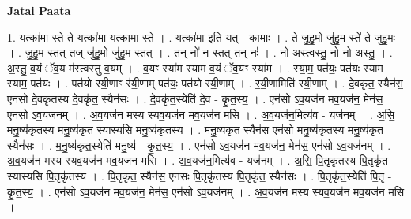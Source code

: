 \documentclass[17pt]{extarticle}
\begin{document}
\textbf{Jatai Paata} \newline

1. यत्का॑मा स्ते ते॒ यत्का॑मा॒ यत्का॑मा स्ते । . यत्का॑मा॒ इति॒ यत् - का॒माः॒ । . ते॒ जु॒हु॒मो जु॑हु॒म स्ते॑ ते जुहु॒मः । . जु॒हु॒म स्तत् तज् जु॑हु॒मो जु॑हु॒म स्तत् । . तन् नो॑ न॒ स्तत् तन् नः॑ । . नो॒ अ॒स्त्व॒स्तु॒ नो॒ नो॒ अ॒स्तु॒ । . अ॒स्तु॒ व॒यं ॅव॒य म॑स्त्वस्तु व॒यम् । . व॒यꣳ स्या॑म स्याम व॒यं ॅव॒यꣳ स्या॑म । . स्या॒म॒ पत॑यः॒ पत॑यः स्याम स्याम॒ पत॑यः । . पत॑यो रयी॒णाꣳ र॑यी॒णाम् पत॑यः॒ पत॑यो रयी॒णाम् । . र॒यी॒णामिति॑ रयी॒णाम् । . दे॒वकृ॑त॒ स्यैन॑स॒ एन॑सो दे॒वकृ॑तस्य दे॒वकृ॑त॒ स्यैन॑सः । . दे॒वकृ॑त॒स्येति॑ दे॒व - कृ॒त॒स्य॒ । . एन॑सो ऽव॒यज॑न मव॒यज॑न॒ मेन॑स॒ एन॑सो ऽव॒यज॑नम् । . अ॒व॒यज॑न मस्य स्यव॒यज॑न मव॒यज॑न मसि । . अ॒व॒यज॑न॒मित्य॑व - यज॑नम् । . अ॒सि॒ म॒नु॒ष्य॑कृतस्य मनु॒ष्य॑कृत स्यास्यसि मनु॒ष्य॑कृतस्य । . म॒नु॒ष्य॑कृत॒ स्यैन॑स॒ एन॑सो मनु॒ष्य॑कृतस्य मनु॒ष्य॑कृत॒ स्यैन॑सः । . म॒नु॒ष्य॑कृत॒स्येति॑ मनु॒ष्य॑ - कृ॒त॒स्य॒ । . एन॑सो ऽव॒यज॑न मव॒यज॑न॒ मेन॑स॒ एन॑सो ऽव॒यज॑नम् । . अ॒व॒यज॑न मस्य स्यव॒यज॑न मव॒यज॑न मसि । . अ॒व॒यज॑न॒मित्य॑व - यज॑नम् । . अ॒सि॒ पि॒तृकृ॑तस्य पि॒तृकृ॑त स्यास्यसि पि॒तृकृ॑तस्य । . पि॒तृकृ॑त॒ स्यैन॑स॒ एन॑सः पि॒तृकृ॑तस्य पि॒तृकृ॑त॒ स्यैन॑सः । . पि॒तृकृ॑त॒स्येति॑ पि॒तृ - कृ॒त॒स्य॒ । . एन॑सो ऽव॒यज॑न मव॒यज॑न॒ मेन॑स॒ एन॑सो ऽव॒यज॑नम् । . अ॒व॒यज॑न मस्य स्यव॒यज॑न मव॒यज॑न मसि । \newline
\end{document}
